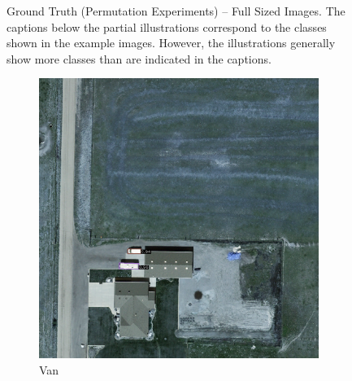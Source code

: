 \begin{figure}[h!]
    \caption[Ground Truth (Permutation Experiments) – Full Sized Images]{Ground Truth (Permutation Experiments) – Full Sized Images. The captions below the partial illustrations correspond to the classes shown in the example images. However, the illustrations generally show more classes than are indicated in the captions.}
    \label{fig:gt_perm_exp_examples_fs}
\end{figure}


\begin{figure}[h!]
    \centering
    \begin{subfigure}[t]{0.38\textwidth}
        \centering
        \includegraphics[width=\linewidth]{images/015Results/02perm_exp/comp_images/rgbir/198.png}
        \caption{Van}
    \end{subfigure}
    \begin{subfigure}[t]{0.38\textwidth}
        \centering

\end{subfigure}
\end{figure}
